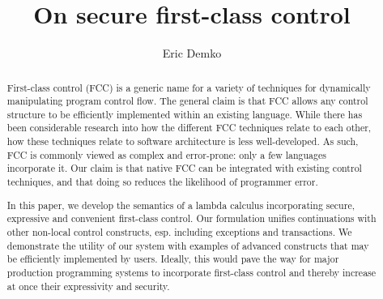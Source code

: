 \documentclass[11pt]{article}
\title{On secure first-class control}
\author{Eric Demko}
\date{} %
\begin{document}
\maketitle
\tableofcontents\newpage

\begin{abstract}
First-class control (FCC) is a generic name for a variety of techniques for dynamically manipulating program control flow.
The general claim is that FCC allows any control structure to be efficiently implemented within an existing language.
While there has been considerable research into how the different FCC techniques relate to each other, how these techniques relate to software architecture is less well-developed.
As such, FCC is commonly viewed as complex and error-prone: only a few languages incorporate it.
Our claim is that native FCC can be integrated with existing control techniques, and that doing so reduces the likelihood of programmer error.



In this paper, we develop the semantics of a lambda calculus incorporating secure, expressive and convenient first-class control.
Our formulation unifies continuations with other non-local control constructs, esp. including exceptions and transactions.
We demonstrate the utility of our system with examples of advanced constructs that may be efficiently implemented by users.
Ideally, this would pave the way for major production programming systems to incorporate first-class control and thereby increase at once their expressivity and security.
\end{abstract}
\end{document}
